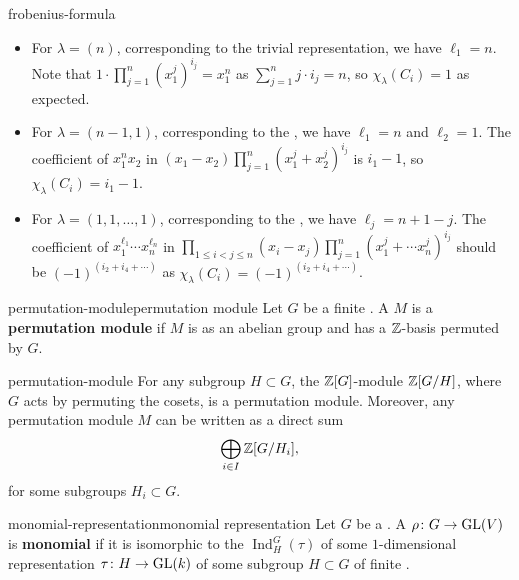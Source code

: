 \begin{example}{frobenius-formula}
    \begin{itemize}
        \item For $\lambda = (n)$, corresponding to the trivial representation, we have $\ell_1 = n$. Note that $1 \cdot \prod_{j = 1}^{n} (x_1^j)^{i_j} = x_1^n$ as $\sum_{j = 1}^{n} j \cdot i_j = n$, so $\chi_\lambda(C_i) = 1$ as expected.
        \item For $\lambda = (n - 1, 1)$, corresponding to the , we have $\ell_1 = n$ and $\ell_2 = 1$. The coefficient of $x_1^n x_2$ in $(x_1 - x_2) \prod_{j = 1}^{n} (x_1^j + x_2^j)^{i_j}$ is $i_1 - 1$, so $\chi_\lambda(C_i) = i_1 - 1$. %
        \item For $\lambda = (1, 1, \ldots, 1)$, corresponding to the , we have $\ell_j = n + 1 - j$. The coefficient of $x_1^{\ell_1} \cdots x_n^{\ell_n}$ in $\prod_{1 \le i < j \le n} (x_i - x_j) \prod_{j = 1}^{n} (x_1^j + \cdots x_n^j)^{i_j}$ should be $(-1)^{(i_2 + i_4 + \cdots)}$ as $\chi_\lambda(C_i) = (-1)^{(i_2 + i_4 + \cdots)}$.
    \end{itemize}
\end{example}

\begin{topic}{permutation-module}{permutation module}
    Let $G$ be a finite . A  $M$ is a \textbf{permutation module} if $M$ is  as an abelian group and has a $\mathbb{Z}$-basis permuted by $G$.
\end{topic}

\begin{example}{permutation-module}
    For any subgroup $H \subset G$, the $\mathbb{Z}[G]$-module $\mathbb{Z}[G/H]$, where $G$ acts by permuting the cosets, is a permutation module. Moreover, any permutation module $M$ can be written as a direct sum
    \[ \bigoplus_{i \in I} \mathbb{Z}[G/H_i] , \]
    for some subgroups $H_i \subset G$.
\end{example}

\begin{topic}{monomial-representation}{monomial representation}
    Let $G$ be a . A  $\rho \colon G \to \textup{GL}(V)$ is \textbf{monomial} if it is isomorphic to the  $\operatorname{Ind}_H^G(\tau)$ of some $1$-dimensional representation $\tau \colon H \to \textup{GL}(k)$ of some subgroup $H \subset G$ of finite .
\end{topic}

